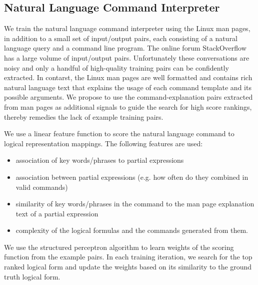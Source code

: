 \subsection{Natural Language Command Interpreter}
\label{subsec:parser}
We train the natural language command interpreter using the Linux man pages, in addition to a small set of input/output pairs, each consisting of a natural language query and a command line program. The online forum StackOverflow has a large volume of input/output pairs. Unfortunately these conversations are noisy and only a handful of high-quality training pairs can be confidently extracted. In contarst, the Linux man pages are well formatted and contains rich natural language text that explains the usage of each command template and its possible arguments. We propose to use the command-explanation pairs extracted from man pages as additional signals to guide the search for high score rankings, thereby remedies the lack of example training pairs.

We use a linear feature function to score the natural language command to logical representation mappings. The following features are used:
\begin{itemize}\itemsep-1pt
	\item association of key words/phrases to partial expressions
	\item association between partial expressions (e.g. how often do they combined in valid commands)
	\item similarity of key words/phrases in the command to the man page explanation text of a partial expression
	\item complexity of the logical formulas and the commands generated from them.
\end{itemize}
We use the structured perceptron algorithm to learn weights of the scoring function from the example pairs. In each training iteration, we search for the top ranked logical form and update the weights based on its similarity to the ground truth logical form.
